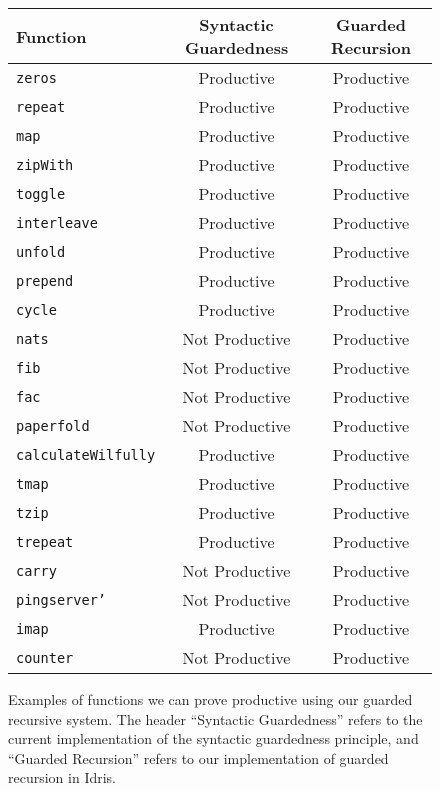 \begin{figure}[h]
\begin{center}
  \begin{tabular}{| l | c | c |} \hline
    Function & Syntactic Guardedness & Guarded Recursion \\ \hline
    \texttt{zeros} & Productive & Productive \\ \hline
    \texttt{repeat} & Productive & Productive \\ \hline
    \texttt{map} & Productive & Productive \\ \hline
    \texttt{zipWith} & Productive & Productive \\ \hline
    \texttt{toggle} & Productive & Productive \\ \hline
    \texttt{interleave} & Productive & Productive \\ \hline
    \texttt{unfold} & Productive & Productive \\ \hline
    \texttt{prepend} & Productive & Productive \\ \hline
    \texttt{cycle} & Productive & Productive \\ \hline
    \texttt{nats} & Not Productive & Productive \\ \hline
    \texttt{fib} & Not Productive & Productive \\ \hline
    \texttt{fac} & Not Productive & Productive \\ \hline
    \texttt{paperfold} & Not Productive & Productive \\ \hline
    \texttt{calculateWilfully} & Productive & Productive \\ \hline
    \texttt{tmap} & Productive & Productive \\ \hline
    \texttt{tzip} & Productive & Productive \\ \hline
    \texttt{trepeat} & Productive & Productive \\ \hline
    \texttt{carry} & Not Productive & Productive \\ \hline
    \texttt{pingserver'} & Not Productive & Productive \\ \hline
    \texttt{imap} & Productive & Productive \\ \hline
    \texttt{counter} & Not Productive & Productive \\ \hline
  \end{tabular}
\end{center}
  \caption{Examples of functions we can prove productive using our guarded
    recursive system. The header ``Syntactic Guardedness'' refers to the current
    implementation of the syntactic guardedness principle, and ``Guarded Recursion''
    refers to our implementation of guarded recursion in Idris.}
  \label{fig:productivity_table_1}
\end{figure}

